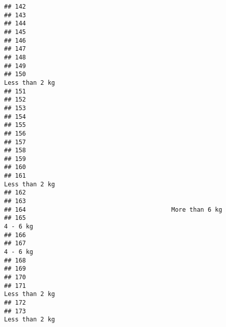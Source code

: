 \documentclass[
]{article}
\begin{document}
\begin{verbatim}
## 142                                                                            
## 143                                                                            
## 144                                                                            
## 145                                                                            
## 146                                                                            
## 147                                                                            
## 148                                                                            
## 149                                                                            
## 150                                                              Less than 2 kg
## 151                                                                            
## 152                                                                            
## 153                                                                            
## 154                                                                            
## 155                                                                            
## 156                                                                            
## 157                                                                            
## 158                                                                            
## 159                                                                            
## 160                                                                            
## 161                                                              Less than 2 kg
## 162                                                                            
## 163                                                                            
## 164                                        More than 6 kg                      
## 165                                                                    4 - 6 kg
## 166                                                                            
## 167                                                                    4 - 6 kg
## 168                                                                            
## 169                                                                            
## 170                                                                            
## 171                                                              Less than 2 kg
## 172                                                                            
## 173                                                              Less than 2 kg

\end{verbatim}
\end{document}
